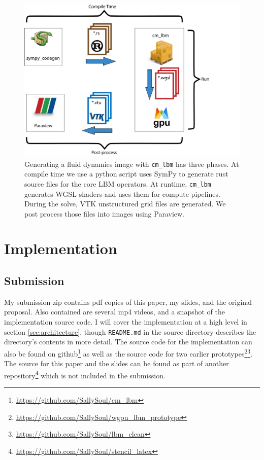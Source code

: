\begin{figure}
\begin{center}
\includegraphics[width=\linewidth]{workflow.png}
\end{center}
  \caption{Generating a fluid dynamics image 
with \lstinline{cm_lbm}
has three phases. 
At compile time we use a
python script uses SymPy to generate
rust source files for the core LBM operators.
At runtime, \lstinline{cm_lbm} generates WGSL shaders
and uses them for compute pipelines.
During the solve, VTK unstructured grid files are
generated. 
We post process those files into images using Paraview.
}
  \label{fig:architecture}
\end{figure}

\section{Implementation}\label{sec:implementation}
\subsection{Submission}
My submission zip contains pdf copies of 
this paper, my slides, and the original proposal. 
Also contained are
several mp4 videos, and a snapshot of the implementation source code.
I will cover the implementation at a high level in section 
\ref{sec:architecture},
though \lstinline{README.md} in the source directory describes
the directory's contents in more detail.
The source code for the implementation can also be found on 
github\footnote{\url{https://github.com/SallySoul/cm_lbm}}
as well as the source code for two earlier 
prototypes\footnote{\url{https://github.com/SallySoul/wgpu_lbm_prototype}}\footnote{\url{https://github.com/SallySoul/lbm_clean}}.
The source for this paper and the slides can be found as 
part of another repository\footnote{\url{https://github.com/SallySoul/stencil_latex}} 
which is not included in the submission.

